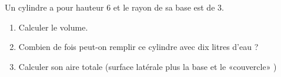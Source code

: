 
\begin{exercice}\label{exosmath-0009}

    Un cylindre a pour hauteur \unit{6}{\centi\meter} et le rayon de sa base est de \unit{3}{\centi\meter}.
    \begin{enumerate}
        \item
            Calculer le volume.
        \item
            Combien de fois peut-on remplir ce cylindre avec dix litres d'eau ?
        \item
            Calculer son aire totale (surface latérale plus la base et le «couvercle» )
    \end{enumerate}

\end{exercice}
